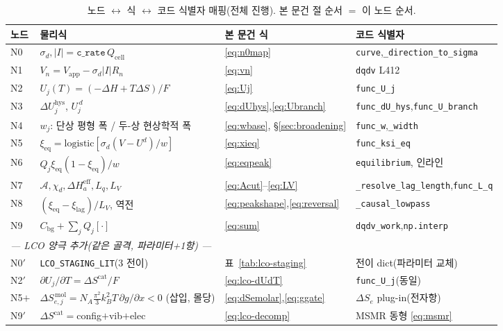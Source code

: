\documentclass[11pt,a4paper]{article}
\newcommand{\eff}{\mathrm{eff}}
\newcommand{\eq}{\mathrm{eq}}
\newcommand{\app}{\mathrm{app}}
\newcommand{\cell}{\mathrm{cell}}
\newcommand{\bg}{\mathrm{bg}}
\newcommand{\hys}{\mathrm{hys}}
\newcommand{\code}[1]{\texttt{#1}}
\begin{document}
\begin{table}[t]
\centering
\renewcommand{\arraystretch}{1.3}
\caption{노드 $\leftrightarrow$ 식 $\leftrightarrow$ 코드 식별자 매핑(전체 진행). 본 문건 절 순서 $=$ 이 노드 순서.}
\label{tab:nodemap}
\begin{tabular}{l l l l}
\toprule
노드 & 물리식 & 본 문건 식 & 코드 식별자 \\
\midrule
N0 & $\sigma_d,|I|=\code{c\_rate}\,Q_\cell$ & \eqref{eq:n0map} & \code{curve},\code{\_direction\_to\_sigma} \\
N1 & $V_n=V_\app-\sigma_d|I|R_n$ & \eqref{eq:vn} & \code{dqdv} L412 \\
N2 & $U_j(T)=(-\Delta H+T\Delta S)/F$ & \eqref{eq:Uj} & \code{func\_U\_j} \\
N3 & $\Delta U_j^\hys$, $U_j^{\,d}$ & \eqref{eq:dUhys},\eqref{eq:Ubranch} & \code{func\_dU\_hys},\code{func\_U\_branch} \\
N4 & $w_j$: 단상 평형 폭 / 두-상 현상학적 폭 & \eqref{eq:wbase}, \S\ref{sec:broadening} & \code{func\_w},\code{\_width} \\
N5 & $\xi_\eq=\mathrm{logistic}[\sigma_d(V-U^d)/w]$ & \eqref{eq:xieq} & \code{func\_ksi\_eq} \\
N6 & $Q_j\xi_\eq(1-\xi_\eq)/w$ & \eqref{eq:eqpeak} & \code{equilibrium}, 인라인 \\
N7 & $\mathcal A,\chi_d,\Delta H_a^\eff,L_q,L_V$ & \eqref{eq:Acut}--\eqref{eq:LV} & \code{\_resolve\_lag\_length},\code{func\_L\_q} \\
N8 & $(\xi_\eq-\xi_\mathrm{lag})/L_V$, 역전 & \eqref{eq:peakshape},\eqref{eq:reversal} & \code{\_causal\_lowpass} \\
N9 & $C_\bg+\sum_jQ_j[\cdot]$ & \eqref{eq:sum} & \code{dqdv\_work},\code{np.interp} \\
\midrule
\multicolumn{4}{l}{\emph{— LCO 양극 추가(같은 골격, 파라미터+1항) —}}\\
N0$'$ & \code{LCO\_STAGING\_LIT}(3 전이) & 표~\ref{tab:lco-staging} & 전이 dict(파라미터 교체) \\
N2$'$ & $\partial U_j/\partial T=\Delta S^\mathrm{cat}/F$ & \eqref{eq:lco-dUdT} & \code{func\_U\_j}(동일) \\
N5$+$ & $\Delta S_{e,j}^{\,\mathrm{mol}}=N_A\tfrac{\pi^2}{3}k_B^2T\,\partial g/\partial x<0$ (삽입, 몰당) & \eqref{eq:dSemolar},\eqref{eq:ggate} & $\Delta S_e$ plug-in(전자항) \\
N9$'$ & $\Delta S^\mathrm{cat}=$config$+$vib$+$elec & \eqref{eq:lco-decomp} & MSMR 동형 \eqref{eq:msmr} \\
\bottomrule
\end{tabular}
\end{table}
\end{document}
